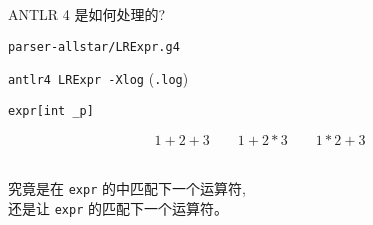 
\begin{frame}{}
  \begin{center}
    \Large{ANTLR 4 是如何处理的?}
  \end{center}
\end{frame}

\begin{frame}{}
  \begin{center}
    \texttt{parser-allstar/LRExpr.g4}

    \vspace{0.30cm}

    \pause
    \vspace{0.80cm}
    \texttt{antlr4 LRExpr -Xlog} \qquad (\texttt{.log})
  \end{center}
\end{frame}

\begin{frame}{}
  \begin{center}

  \pause
  \end{center}
\end{frame}

\begin{frame}{}

  \begin{center}
	\texttt{expr[int \_p]}
  \end{center}

\end{frame}

\begin{frame}{}
  \begin{center}
  \end{center}


  \[
    1 + 2 + 3 \qquad 1 + 2 \ast 3 \qquad 1 * 2 + 3
  \]
\end{frame}

\begin{frame}{}
  \begin{center}
     \\[10pt]
    究竟是在 \texttt{expr} 的中匹配下一个运算符, \\[15pt]
    还是让 \texttt{expr} 的匹配下一个运算符。
  \end{center}
\end{frame}

